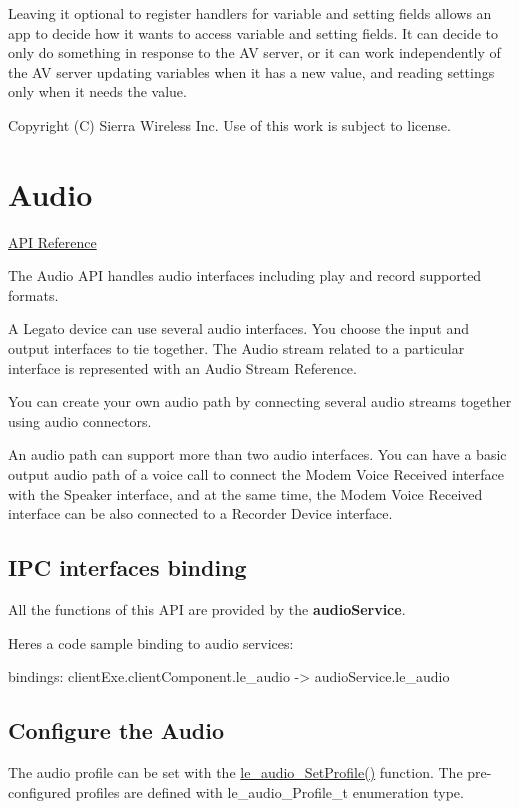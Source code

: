 Leaving it optional to register handlers for variable and setting fields allows an app to decide how it wants to access variable and setting fields. It can decide to only do something in response to the A\+V server, or it can work independently of the A\+V server updating variables when it has a new value, and reading settings only when it needs the value.





Copyright (C) Sierra Wireless Inc. Use of this work is subject to license. \hypertarget{c_audio}{}\section{Audio}\label{c_audio}
\hyperlink{le__audio__interface_8h}{A\+P\+I Reference}





The Audio A\+P\+I handles audio interfaces including play and record supported formats.

A Legato device can use several audio interfaces. You choose the input and output interfaces to tie together. The Audio stream related to a particular interface is represented with an \textquotesingle{}Audio Stream Reference\textquotesingle{}.

You can create your own audio path by connecting several audio streams together using audio connectors.

An audio path can support more than two audio interfaces. You can have a basic output audio path of a voice call to connect the Modem Voice Received interface with the Speaker interface, and at the same time, the Modem Voice Received interface can be also connected to a Recorder Device interface.\hypertarget{c_audio_le_audio_binding}{}\subsection{I\+P\+C interfaces binding}\label{c_audio_le_audio_binding}
All the functions of this A\+P\+I are provided by the {\bfseries audio\+Service}.

Here\textquotesingle{}s a code sample binding to audio services\+: \begin{DoxyVerb}bindings:
{
   clientExe.clientComponent.le_audio -> audioService.le_audio
}
\end{DoxyVerb}
\hypertarget{c_audio_le_audio_configuration}{}\subsection{Configure the Audio}\label{c_audio_le_audio_configuration}
The audio profile can be set with the \hyperlink{le__audio__interface_8h_ae2e6553f8125a30676d31f5cbd43a3b8}{le\+\_\+audio\+\_\+\+Set\+Profile()} function. The pre-\/configured profiles are defined with {\ttfamily le\+\_\+audio\+\_\+\+Profile\+\_\+t} enumeration type.

